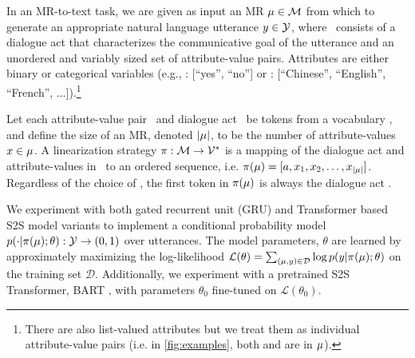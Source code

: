In an MR-to-text task, we are given as input an MR $\mu \in \mathcal{M}$ from which
to generate an appropriate natural language utterance $y  \in \mathcal{Y}$, where
\mr~consists of a dialogue act that characterizes the communicative goal of the
utterance and an unordered and variably sized set of attribute-value pairs.
Attributes are either binary or categorical variables (e.g.,
: [``yes'', ``no''] or : [``Chinese'',
``English'', ``French'', $\ldots$]).\footnote{There are also list-valued
attributes but we treat them as individual attribute-value pairs (i.e. in
\autoref{fig:examples}, both  and
 are in $\mu$).}

Let each attribute-value pair \attr~and dialogue act \da~be tokens from a
vocabulary \Attrs, and define the size of an MR, denoted  ${\lvert \mu \rvert}$,  to be
the number of attribute-values $x \in \mu$.  A linearization
strategy $\pi : \mathcal{M} \rightarrow \mathcal{V}^*$ is a mapping of the dialogue act
and attribute-values in \mr~to an ordered sequence, i.e.  $\pi(\mu) = [a,
x_1, x_2, \ldots, x_{{\lvert \mu \rvert}}]$.  Regardless of the choice of
\lin, the first token in $\pi(\mu)$ is always the dialogue act \da.

We experiment with both gated recurrent unit (GRU) \cite{cho2014} and
Transformer \cite{vaswani2017} based S2S model variants to implement a
conditional probability model $p(\cdot| \pi(\mu); \theta) : \mathcal{Y}
\rightarrow (0, 1)$ over utterances. The model parameters,
$\theta$ are learned by approximately maximizing the log-likelihood
$\mathcal{L}(\theta)= \sum_{(\mu,y)\in \mathcal{D}}  \log
p(y|\pi(\mu); \theta)$ on the training set $\mathcal{D}$.
Additionally, we experiment with a pretrained S2S Transformer, BART
\cite{lewis2020}, with parameters $\theta_0$ fine-tuned on
$\mathcal{L}(\theta_0)$.
